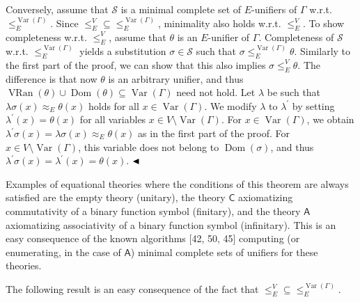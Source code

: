 Conversely, assume that $\mathcal{S}$ is a minimal complete set of $E$-unifiers of $\Gamma$ w.r.t. $\leq_{E}^{\operatorname{Var}(\Gamma)}$. Since ${\leq_{E}^{V}}\subseteq{\leq_{E}^{\operatorname{Var}(\Gamma)}}$, minimality also holds w.r.t. $\leq_{E}^{V}$. To show completeness w.r.t. $\leq_{E}^{V}$, assume that $\theta$ is an $E$-unifier of $\Gamma$. Completeness of $\mathcal{S}$ w.r.t. $\leq_{E}^{\operatorname{Var}(\Gamma)}$ yields a substitution $\sigma\in\mathcal{S}$ such that $\sigma\leq_{E}^{\operatorname{Var}(\Gamma)}\theta$. Similarly to the first part of the proof, we can show that this also implies $\sigma\leq_{E}^{V}\theta$. The difference is that now $\theta$ is an arbitrary unifier, and thus $\operatorname{VRan}(\theta)\cup\operatorname{Dom}(\theta)\subseteq%
\operatorname{Var}(\Gamma)$ need not hold. Let $\lambda$ be such that $\lambda\sigma(x)\approx_{E}\theta(x)$ holds for all $x\in\operatorname{Var}(\Gamma)$. We modify $\lambda$ to $\lambda^{\prime}$ by setting $\lambda^{\prime}(x)=\theta(x)$ for all variables $x\in V\setminus\operatorname{Var}(\Gamma)$. For $x\in\operatorname{Var}(\Gamma)$, we obtain $\lambda^{\prime}\sigma(x)=\lambda\sigma(x)\approx_{E}\theta(x)$ as in the first part of the proof. For $x\in V\setminus\operatorname{Var}(\Gamma)$, this variable does not belong to $\operatorname{Dom}(\sigma)$, and thus $\lambda^{\prime}\sigma(x)=\lambda^{\prime}(x)=\theta(x)$. $\hfill\blacktriangleleft$\par
 
 
 
Examples of equational theories where the conditions of this theorem are always satisfied are the empty theory (unitary), the theory $\mathsf{C}$ axiomatizing commutativity of a binary function symbol (finitary), and the theory $\mathsf{A}$ axiomatizing associativity of a binary function symbol (infinitary). This is an easy consequence of the known algorithms [42, 50, 45] computing (or enumerating, in the case of $\mathsf{A}$) minimal complete sets of unifiers for these theories.\par
 
 
 
The following result is an easy consequence of the fact that ${\leq_{E}^{V}}\subseteq{\leq_{E}^{\operatorname{Var}(\Gamma)}}$.\par
 

